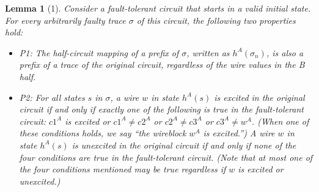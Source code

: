 \documentclass[12pt]{report}
\newtheorem*{lemma}{Lemma}
\begin{document}
\begin{lemma}[1]
Consider a fault-tolerant circuit that starts in a valid initial state.  For every arbitrarily faulty trace $\sigma$ of this circuit, the following two properties hold: %
\begin{itemize}
\item P1: The half-circuit mapping of a prefix of $\sigma$, written as $h^{A}(\sigma_n)$, is also a prefix of a trace of the original circuit, regardless of the wire values in the B half.
\item P2: For all states $s$ in $\sigma$, a wire $w$ in state $h^A(s)$ is excited in the original circuit if and only if exactly one of the following is true in the fault-tolerant circuit: $c1^A$ is excited or $c1^{A}\neq c2^{A}$ or $c2^{A}\neq c3^A$ or $c3^{A}\neq w^A$.  (When one of these conditions holds, we say “the wireblock $w^A$ is excited.”)  A wire $w$ in state $h^A(s)$ is unexcited in the original circuit if and only if none of the four conditions are true in the fault-tolerant circuit.  (Note that at most one of the four conditions mentioned may be true regardless if $w$ is excited or unexcited.) 
\end{itemize}
 



\end{lemma}
\end{document}
